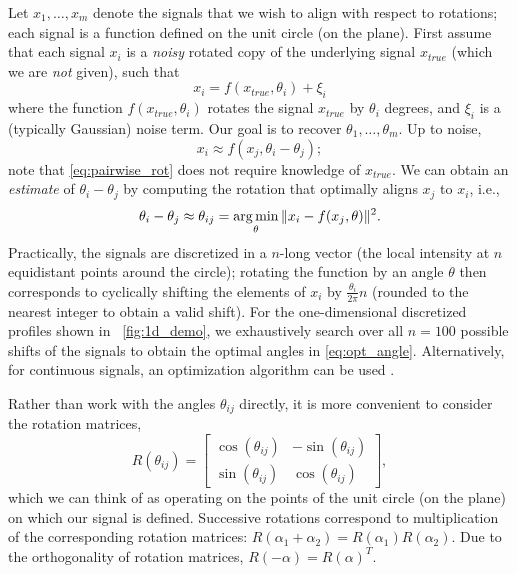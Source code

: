 Let $ x_1, \dots, x_m$ denote the signals that we wish to align with respect to rotations;
each signal is a function defined on the unit circle (on the plane).
%
First assume that each signal $x_i$ is a {\it noisy} rotated copy of the underlying signal $x_{true}$
(which we are {\it not} given), such that
\begin{equation}
x_i = f(x_{true}, \theta_i) + \xi_i
\end{equation}
where the function $f(x_{true}, \theta_i)$ rotates the signal $x_{true}$ by $\theta_i$ degrees, and $\xi_i$ is a (typically Gaussian) noise term.
%
Our goal is to recover $\theta_1, \dots, \theta_m$.
%
Up to noise,
\begin{equation} \label{eq:pairwise_rot}
x_i \approx f(x_j, \theta_i - \theta_j) ;
\end{equation}
note that \eqref{eq:pairwise_rot} does not require knowledge of $x_{true}$.
%
We can obtain an {\it estimate} of $\theta_i - \theta_j$ by computing the rotation that optimally aligns $x_j$ to $x_i$,
i.e., %
%
\begin{equation} \label{eq:opt_angle}
\theta_i - \theta_j \approx \theta_{ij} = \operatorname*{arg\,min}_{\theta} \|x_i - f(x_j, \theta)\|^2.
\end{equation}
%
Practically, the signals are discretized in a $n$-long vector (the local intensity at $n$ equidistant points around the circle);
rotating the function by an angle $\theta$ then corresponds to cyclically shifting the elements of $x_i$
by $\frac{\theta_i}{2 \pi} n$ (rounded to the nearest integer to obtain a valid shift).
%
For the one-dimensional discretized profiles shown in \fig~\ref{fig:1d_demo}, we exhaustively search over all $n=100$ possible shifts of the signals to obtain the optimal angles in \eqref{eq:opt_angle}.
%
Alternatively, for continuous signals, an optimization algorithm
can be used \citep{ahuja2007template}.

Rather than work with the angles $\theta_{ij}$ directly, it is more convenient to consider the rotation matrices,
\begin{equation} \label{eq:R_theta}
R(\theta_{ij}) = \begin{bmatrix}
\cos(\theta_{ij}) & -\sin(\theta_{ij}) \\
\sin(\theta_{ij}) & \cos(\theta_{ij})
\end{bmatrix},
\end{equation}
which we can think of as operating on the points of the unit circle (on the plane) on which our signal is defined.
%
Successive rotations correspond to multiplication of the corresponding rotation matrices: $R(\alpha_1 + \alpha_2) = R(\alpha_1) R(\alpha_2)$.
%
Due to the orthogonality of rotation matrices, $R(-\alpha) = R(\alpha)^T$.


